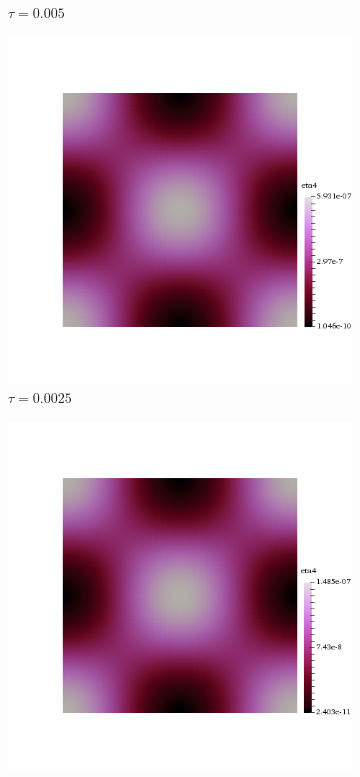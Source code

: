 \begin{figure}[h!]
\begin{subfigure}[b]{0.24\textwidth}
    \caption{$\tau=0.005$}
  \end{subfigure}
  \begin{subfigure}[b]{0.24\textwidth}
    \includegraphics[width=\textwidth,height=\textheight,keepaspectratio,height=\textheight,keepaspectratio]{figures/2_mpet/no_transfer/time/eta4_dt3.png}
    \caption{$\tau=0.0025$}
  \end{subfigure}
  \begin{subfigure}[b]{0.24\textwidth}
    \includegraphics[width=\textwidth,height=\textheight,keepaspectratio,height=\textheight,keepaspectratio]{figures/2_mpet/no_transfer/time/eta4_dt4.png}

\end{subfigure}
\end{figure}
